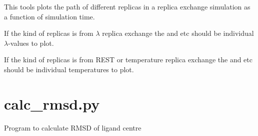 \documentclass[letterpaper,10pt,english]{sphinxmanual}
\begin{document}

%
\begin{sphinxVerbatim}[commandchars=\\\{\}]
     
        
        
\end{sphinxVerbatim}


This tools plots the path of different replicas in a replica exchange simulation as a function of simulation time.

If the kind of replicas is from \(\lambda\) replica exchange the  and  etc should be individual \(\lambda\)-values to plot.

If the kind of replicas is from REST or temperature replica exchange the  and  etc should be individual temperatures to plot.


\section{calc\_rmsd.py}
\label{\detokenize{tools:calc-rmsd-py}}

Program to calculate RMSD of ligand centre


%
\begin{sphinxVerbatim}[commandchars=\\\{\}]
  \PYG{p}{[}\PYG{p}{]} \PYG{p}{[} \PYG{p}{]} \PYG{p}{[}  \PYG{p}{[} \PYG{p}{]}\PYG{p}{]} \PYG{p}{[} \PYG{p}{]}
                    \PYG{p}{[} \PYG{p}{]} \PYG{p}{[} \PYG{p}{]}
\end{sphinxVerbatim}
\end{document}
